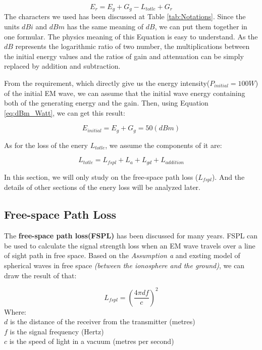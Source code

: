 \documentclass{mcmthesis}
\begin{document}
      \begin{equation}\label{eq:transmitting}
        E_{r} = E_{g} + G_{g} - L_{totle} + G_{r}
      \end{equation}
      The characters we used has been discussed at Table \ref{tab:Notations}. Since the units \emph{$dBi$} and \emph{$dBm$} has the same meaning of \emph{$dB$}, we can put them together in one formular. The physics meaning of this Equation is easy to understand. As the \emph{$dB$} represents the logarithmic ratio of two number, the multiplications between the initial energy values and the ratios of gain and attenuation can be simply replaced by addition and subtraction.

    From the requirement, which directly give us the energy intensity($P_{initial} = 100 W $) of the initial EM wave, we can assume that the initial wave energy containing both of the generating energy and the gain. Then, using Equation \ref{eq:dBm_Watt}, we can get this result:

      \begin{equation}\label{eq:E_initial}
        E_{initial} = E_{g} + G_{g} = 50 (dBm)
      \end{equation}

    As for the loss of the enery $L_{totle}$, we assume the components of it are:

      \begin{equation}
        L_{totle} = L_{fspl} + L_{a} + L_{gd} + L_{addition}
      \end{equation}

     In this section, we will only study on the free-space path loss ($L_{fspl}$). And the details of other sections of the enery loss will be analyzed later.

  \subsection{Free-space Path Loss}

      The \textbf{free-space path loss(FSPL)}\cite{freespacepathloss} has been discussed for many years. FSPL can be used to calculate the signal strength loss when an EM wave travels over a line of sight path in free space. Based on the \emph{Assumption a} and exsting model of spherical waves in free space \emph{(between the ionosphere and the ground)}, we can draw the result of that:

        \begin{equation}\label{eq:FSPL_old}
          L_{fspl} = (\frac{4 \pi d f}{c})^{2}
        \end{equation}
        Where: \\
        $d$ is the distance of the receiver from the transmitter (metres)\\
        $f$ is the signal frequency (Hertz)\\
        $c$ is the speed of light in a vacuum (metres per second)\\
\end{document}
